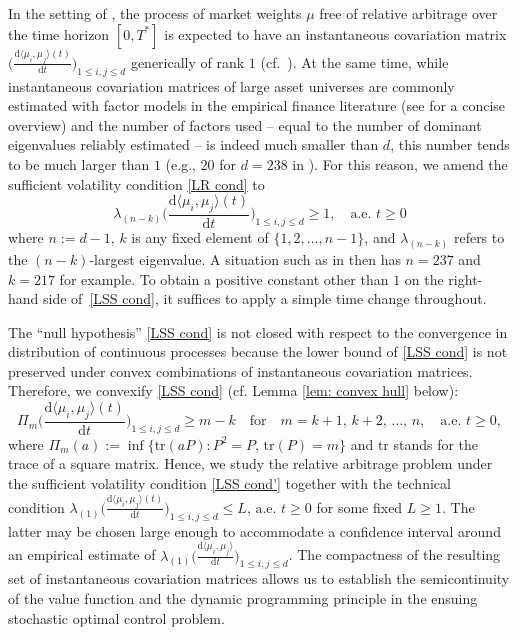 \documentclass[11pt]{amsart}
\numberwithin{equation}{section}
\begin{document}
\medskip

In the setting of \cite{larsson_relative_2021}, the process of market weights $\mu$ 
free of relative arbitrage over the time horizon $[0,T^*]$ is expected to have an instantaneous covariation matrix $\big(\frac{\mathrm{d}\langle \mu_i,\mu_j\rangle(t)}{\mathrm{d}t}\big)_{1\le i,j\le d}$ generically of rank $1$  (cf.~\cite[discussion following Remark 1.4]{larsson_minimum_2022}). At the same time, while instantaneous covariation matrices of large asset universes are commonly estimated with factor models in the empirical finance literature (see \cite[Section 8]{johansson_simple_2023} for a concise overview) and the number of factors used -- equal to the number of dominant eigenvalues reliably estimated -- is indeed much smaller than $d$, this number tends to be much larger than $1$ (e.g., $20$ for $d=238$ in \cite[Figure 8.1]{johansson_simple_2023}). For this reason, we amend the sufficient volatility condition \eqref{LR cond} to 
\begin{equation}\label{LSS cond}
\lambda_{(n-k)}\bigg(\frac{\mathrm{d}\langle \mu_i,\mu_j\rangle(t)}{\mathrm{d}t}\bigg)_{1\le i,j\le d}\ge 1,\quad \text{a.e. }t\ge0
\end{equation}
where $n:=d-1$, $k$ is any fixed element of $\{1,2,\ldots,n-1\}$, and $\lambda_{(n-k)}$ refers to the $(n-k)$-largest eigenvalue. A situation such as in \cite[Figure 8.1]{johansson_simple_2023} then has $n=237$ and $k=217$ for example. To obtain a positive constant other than $1$ on the right-hand side of~\eqref{LSS cond}, it suffices to apply a simple time change throughout. 

\medskip

The ``null hypothesis'' \eqref{LSS cond} is not closed with respect to the convergence in distribution of continuous processes because the lower bound of \eqref{LSS cond} is not preserved under convex combinations of instantaneous covariation matrices. Therefore, we convexify \eqref{LSS cond} (cf. Lemma \ref{lem: convex hull} below): 
\begin{equation}\label{LSS cond'}
\Pi_m\bigg(\frac{\mathrm{d}\langle \mu_i,\mu_j\rangle(t)}{\mathrm{d}t}\bigg)_{1\le i,j\le d}\geq m-k \quad\text{for}\quad m = k+1,\, k+2,\,\ldots,\, n,\quad \text{a.e. } t\ge0,
\end{equation}
where $\Pi_m(a):= \inf\{\text{tr}(aP)\!: P^2 = P,\,\text{tr}(P)=m\}$ and $\text{tr}$ stands for the trace of a square matrix. Hence, we study the relative arbitrage problem under the sufficient volatility condition \eqref{LSS cond'} together with the technical condition 
$\lambda_{(1)}\big(\frac{\mathrm{d}\langle \mu_i,\mu_j\rangle(t)}{\mathrm{d}t}\big)_{1\le i,j\le d}\le L$, $\text{a.e. }t\ge0$ for some fixed $L\ge1$. The latter may be chosen large enough to accommodate a confidence interval around an empirical estimate of $\lambda_{(1)}\big(\frac{\mathrm{d}\langle \mu_i,\mu_j\rangle}{\mathrm{d}t}\big)_{1\le i,j\le d}$. The compactness of the resulting set of instantaneous covariation matrices allows us to establish the semicontinuity of the value function and the dynamic programming principle in the ensuing stochastic optimal control problem. 
\end{document}

